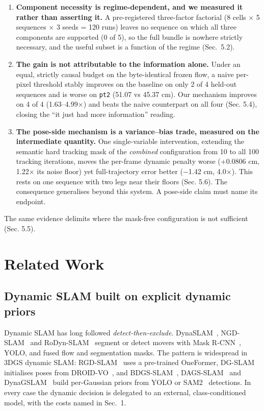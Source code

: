 \begin{enumerate}\setlength{\itemsep}{0pt}
\item \textbf{Component necessity is regime-dependent, and we measured it rather than asserting it.} A pre-registered three-factor factorial (8 cells $\times$ 5 sequences $\times$ 3 seeds = 120 runs) leaves no sequence on which all three components are supported (0 of 5), so the full bundle is nowhere strictly necessary, and the useful subset is a function of the regime (Sec.~5.2).

\item \textbf{The gain is not attributable to the information alone.} Under an equal, strictly causal budget on the byte-identical frozen flow, a naive per-pixel threshold stably improves on the baseline on only 2 of 4 held-out sequences and is worse on \texttt{pt2} (51.07 vs 45.37 cm). Our mechanism improves on 4 of 4 (1.63--4.99$\times$) and beats the naive counterpart on all four (Sec. 5.4), closing the ``it just had more information'' reading.

\item \textbf{The pose-side mechanism is a variance--bias trade, measured on the intermediate quantity.} One single-variable intervention, extending the semantic hard tracking mask of the \emph{combined} configuration from 10 to all 100 tracking iterations, moves the per-frame dynamic penalty worse (+0.0806 cm, 1.22$\times$ its noise floor) yet full-trajectory error better ($-$1.42 cm, 4.0$\times$). This rests on one sequence with two legs near their floors (Sec. 5.6). The consequence generalises beyond this system. A pose-side claim must name its endpoint.
\end{enumerate}


The same evidence delimits where the mask-free configuration is not sufficient (Sec. 5.5).




\section{Related Work}


\subsection{Dynamic SLAM built on explicit dynamic priors}


Dynamic SLAM has long followed \emph{detect-then-exclude}. DynaSLAM~\cite{dynaslam}, NGD-SLAM~\cite{ngdslam} and RoDyn-SLAM~\cite{rodynslam} segment or detect movers with Mask R-CNN~\cite{maskrcnn}, YOLO, and fused flow and segmentation masks. The pattern is widespread in 3DGS dynamic SLAM: RGD-SLAM~\cite{rgdslam} uses a pre-trained OneFormer, DG-SLAM~\cite{dgslam} initialises poses from DROID-VO~\cite{droidslam}, and BDGS-SLAM~\cite{bdgsslam}, DAGS-SLAM~\cite{dagsslam} and DynaGSLAM~\cite{dynagslam} build per-Gaussian priors from YOLO or SAM2~\cite{sam2} detections. In every case the dynamic decision is delegated to an external, class-conditioned model, with the costs named in Sec.~1.


